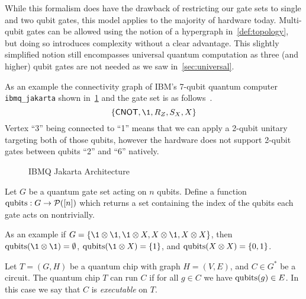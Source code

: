 While this formalism does have the drawback of restricting our gate sets to single and two qubit gates, this model applies to the majority of hardware today.
Multi-qubit gates can be allowed using the notion of a hypergraph in~\cref{def:topology}, but doing so introduces complexity without a clear advantage.
This slightly simplified notion still encompasses universal quantum computation as three (and higher) qubit gates are not needed as we saw in~\cref{sec:universal}.

As an example the connectivity graph of IBM's 7-qubit quantum computer \texttt{ibmq\_jakarta} shown in~\cref{fig:ibm-jakarta} and the gate set is as follows~\cite{ibmq}.
\begin{equation} %
    \qty{\CNOT, \1, R_Z, S_X, X}
\end{equation}
Vertex ``3'' being connected to ``1'' means that we can apply a 2-qubit unitary targeting both of those qubits, however the hardware does not support 2-qubit gates between qubits ``2'' and ``6'' natively.
\begin{figure}[ht]
    \centering
    
    \caption{IBMQ Jakarta Architecture}\label{fig:ibm-jakarta}
\end{figure}

\begin{definition} %
    Let $G$ be a quantum gate set acting on $n$ qubits.
    Define a function $\operatorname{qubits}: G \to \mathcal{P}([n])$ which returns a set containing the index of the qubits each gate acts on nontrivially.
\end{definition}
As an example if $G = \qty{\1 \otimes \1, \1 \otimes X, X \otimes \1, X \otimes X}$, then $\qubits(\1 \otimes \1) = \emptyset$, $\qubits(\1 \otimes X) = \qty{1}$, and $\operatorname{qubits}(X \otimes X) = \qty{0, 1}$.

\begin{definition}
    Let $T = (G, H)$ be a quantum chip with graph $H = (V, E)$, and $C \in G^*$ be a circuit.
    The quantum chip $T$ can run $C$ if for all $g \in C$ we have $\operatorname{qubits}(g) \in E$.
    In this case we say that $C$ is \emph{executable} on $T$.
\end{definition}

